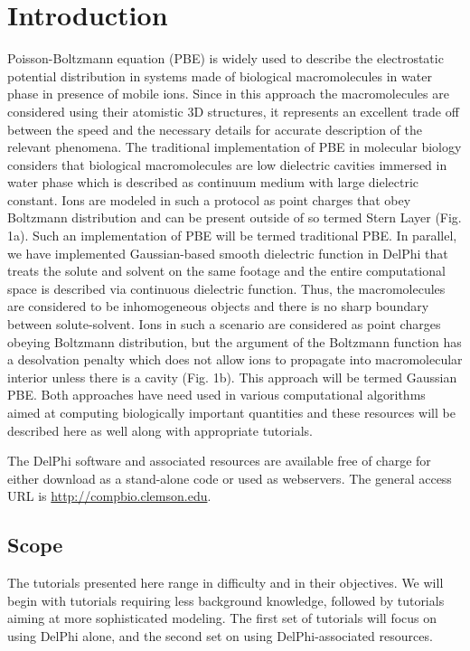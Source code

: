 \documentclass[9pt,tutorial]{livecoms}
\begin{document}
\section{Introduction}
Poisson-Boltzmann equation (PBE) is widely used to describe the electrostatic potential distribution in systems made of biological macromolecules in water phase in presence of mobile ions\cite{xiao2017continuum,li2013progress,jurrus2018improvements,nguyen2017accurate}. Since in this approach the macromolecules are considered using their atomistic 3D structures, it represents an excellent trade off between the speed and the necessary details for accurate description of the relevant phenomena. The traditional implementation of PBE in molecular biology considers that biological macromolecules are low dielectric cavities immersed in water phase which is described as continuum medium with large dielectric constant. Ions are modeled in such a protocol as point charges that obey Boltzmann distribution and can be present outside of so termed Stern Layer (Fig. 1a). Such an implementation of PBE will be termed traditional PBE. In parallel, we have implemented Gaussian-based smooth dielectric function in DelPhi that treats the solute and solvent on the same footage and the entire computational space is described via continuous dielectric function\cite{chakravorty2018gaussian,jia2017treating,li2014modeling,li2013dielectric}. Thus, the macromolecules are considered to be inhomogeneous objects and there is no sharp boundary between solute-solvent. Ions in such a scenario are considered as point charges obeying Boltzmann distribution, but the argument of the Boltzmann function has a desolvation penalty which does not allow ions to propagate into macromolecular interior unless there is a cavity (Fig. 1b). This approach will be termed Gaussian PBE. Both approaches have need used in various computational algorithms aimed at computing biologically important quantities and these resources will be described here as well along with appropriate tutorials.

The DelPhi software and associated resources are available free of charge for either download as a stand-alone code or used as webservers. The general access URL is \url{http://compbio.clemson.edu}. 

\subsection{Scope}

The tutorials presented here range in difficulty and in their objectives. We will begin with tutorials requiring less background knowledge, followed by tutorials aiming at more sophisticated modeling. The first set of tutorials will focus on using DelPhi alone, and the second set on using DelPhi-associated resources.
\end{document}
